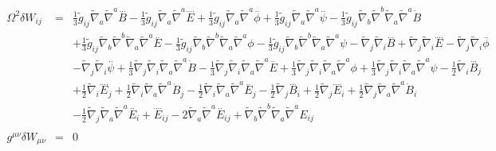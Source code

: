 \documentclass[10pt,letterpaper]{article}
\numberwithin{equation}{section}
\begin{document}
\begin{eqnarray}
\Omega^2\delta W_{ij}&=& \tfrac{1}{3} \tilde{g}_{ij} \tilde{\nabla}_{a}\tilde{\nabla}^{a}\overset{...}{B} -  \tfrac{1}{3} \tilde{g}_{ij} \tilde{\nabla}_{a}\tilde{\nabla}^{a}\overset{....}{E} + \tfrac{1}{3} \tilde{g}_{ij} \tilde{\nabla}_{a}\tilde{\nabla}^{a}\overset{..}{\phi} + \tfrac{1}{3} \tilde{g}_{ij} \tilde{\nabla}_{a}\tilde{\nabla}^{a}\overset{..}{\psi} -  \tfrac{1}{3} \tilde{g}_{ij} \tilde{\nabla}_{b}\tilde{\nabla}^{b}\tilde{\nabla}_{a}\tilde{\nabla}^{a}\dot{B} \nonumber \\ 
&& + \tfrac{1}{3} \tilde{g}_{ij} \tilde{\nabla}_{b}\tilde{\nabla}^{b}\tilde{\nabla}_{a}\tilde{\nabla}^{a}\overset{..}{E} -  \tfrac{1}{3} \tilde{g}_{ij} \tilde{\nabla}_{b}\tilde{\nabla}^{b}\tilde{\nabla}_{a}\tilde{\nabla}^{a}\phi -  \tfrac{1}{3} \tilde{g}_{ij} \tilde{\nabla}_{b}\tilde{\nabla}^{b}\tilde{\nabla}_{a}\tilde{\nabla}^{a}\psi -  \tilde{\nabla}_{j}\tilde{\nabla}_{i}\overset{...}{B} + \tilde{\nabla}_{j}\tilde{\nabla}_{i}\overset{....}{E} -  \tilde{\nabla}_{j}\tilde{\nabla}_{i}\overset{..}{\phi} \nonumber \\ 
&& -  \tilde{\nabla}_{j}\tilde{\nabla}_{i}\overset{..}{\psi} + \tfrac{1}{3} \tilde{\nabla}_{j}\tilde{\nabla}_{i}\tilde{\nabla}_{a}\tilde{\nabla}^{a}\dot{B} -  \tfrac{1}{3} \tilde{\nabla}_{j}\tilde{\nabla}_{i}\tilde{\nabla}_{a}\tilde{\nabla}^{a}\overset{..}{E} + \tfrac{1}{3} \tilde{\nabla}_{j}\tilde{\nabla}_{i}\tilde{\nabla}_{a}\tilde{\nabla}^{a}\phi + \tfrac{1}{3} \tilde{\nabla}_{j}\tilde{\nabla}_{i}\tilde{\nabla}_{a}\tilde{\nabla}^{a}\psi - \tfrac{1}{2} \tilde{\nabla}_{i}\overset{...}{B}_{j} \nonumber \\ 
&& + \tfrac{1}{2} \tilde{\nabla}_{i}\overset{....}{E}_{j} + \tfrac{1}{2} \tilde{\nabla}_{i}\tilde{\nabla}_{a}\tilde{\nabla}^{a}\dot{B}_{j} -  \tfrac{1}{2} \tilde{\nabla}_{i}\tilde{\nabla}_{a}\tilde{\nabla}^{a}\overset{..}{E}_{j} -  \tfrac{1}{2} \tilde{\nabla}_{j}\overset{...}{B}_{i} + \tfrac{1}{2} \tilde{\nabla}_{j}\overset{....}{E}_{i} + \tfrac{1}{2} \tilde{\nabla}_{j}\tilde{\nabla}_{a}\tilde{\nabla}^{a}\dot{B}_{i} \nonumber \\ 
&& -  \tfrac{1}{2} \tilde{\nabla}_{j}\tilde{\nabla}_{a}\tilde{\nabla}^{a}\overset{..}{E}_{i}+\overset{....}{E}_{ij} - 2 \tilde{\nabla}_{a}\tilde{\nabla}^{a}\overset{..}{E}_{ij} + \tilde{\nabla}_{b}\tilde{\nabla}^{b}\tilde{\nabla}_{a}\tilde{\nabla}^{a}E_{ij}
\\  \nonumber\\ 
g^{\mu\nu}\delta W_{\mu\nu}&=& 0
\end{eqnarray}

\end{document}
